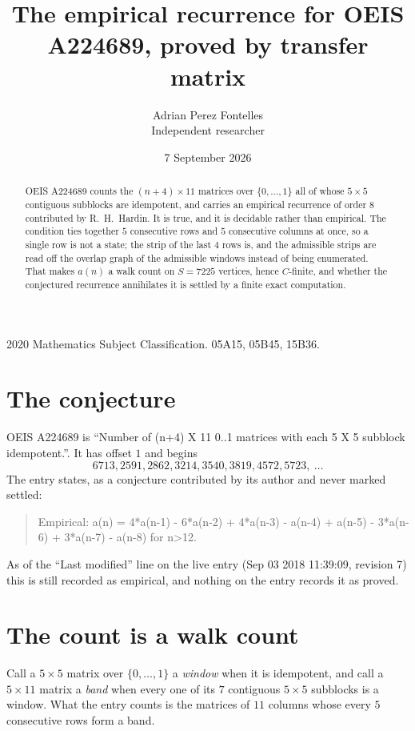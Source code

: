 \documentclass[11pt,a4paper]{article}
\title{The empirical recurrence for OEIS A224689, proved by transfer matrix}
\author{Adrian Perez Fontelles\\ \small Independent researcher}
\date{7 September 2026}
\theoremstyle{plain}
\theoremstyle{definition}
\begin{document}
\maketitle

\begin{abstract}
OEIS A224689 counts the $(n+4)\times11$ matrices over $\{0,\dots,1\}$ all of whose
$5\times5$ contiguous subblocks are idempotent, and carries an empirical recurrence of order
$8$ contributed by R.~H.~Hardin. It is true, and it is decidable rather than empirical.
The condition ties together $5$ consecutive rows and $5$ consecutive columns at once, so a
single row is not a state; the strip of the last $4$ rows is, and the admissible strips
are read off the overlap graph of the admissible windows instead of being enumerated. That
makes $a(n)$ a walk count on $S=7225$ vertices, hence $C$-finite, and whether the conjectured
recurrence annihilates it is settled by a finite exact computation.
\end{abstract}

\noindent\small 2020 Mathematics Subject Classification. 05A15, 05B45, 15B36.\normalsize

\section{The conjecture}

OEIS A224689 is ``Number of (n+4) X 11 0..1 matrices with each 5 X 5 subblock idempotent.''. It has offset $1$ and begins
\[
6713, 2591, 2862, 3214, 3540, 3819, 4572, 5723,\ \dots
\]
The entry states, as a conjecture contributed by its author and never marked settled:
\begin{quote}
Empirical: a(n) = 4*a(n-1) - 6*a(n-2) + 4*a(n-3) - a(n-4) + a(n-5) - 3*a(n-6) + 3*a(n-7) - a(n-8) for n>12.
\end{quote}
As of the ``Last modified'' line on the live entry (Sep 03 2018 11:39:09, revision 7) this is still
recorded as empirical, and nothing on the entry records it as proved.

\section{The count is a walk count}

Call a $5\times5$ matrix over $\{0,\dots,1\}$ a \emph{window} when it is idempotent, and
call a $5\times11$ matrix a \emph{band} when every one of its $7$ contiguous
$5\times5$ subblocks is a window. What the entry counts is the matrices of $11$ columns
whose every $5$ consecutive rows form a band.
\end{document}
